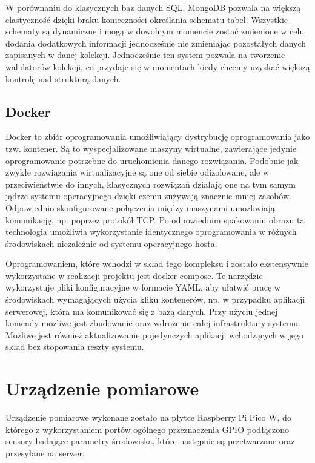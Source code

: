 W porównaniu do klasycznych baz danych SQL, MongoDB pozwala na większą elastyczność dzięki braku
konieczności określania schematu tabel. Wszystkie schematy są dynamiczne i mogą w dowolnym momencie 
zostać zmienione w celu dodania dodatkowych informacji jednocześnie nie zmieniając pozostałych
danych zapisanych w danej kolekcji. Jednocześnie ten system pozwala na tworzenie 
walidatorów kolekcji, co przydaje się w momentach kiedy chcemy uzyskać większą kontrolę
nad strukturą danych.

\subsection*{Docker}
Docker to zbiór oprogramowania umożliwiający dystrybucję oprogramowania jako tzw. kontener.
Są to wyspecjalizowane maszyny wirtualne, zawierające jedynie oprogramowanie potrzebne
do uruchomienia danego rozwiązania. Podobnie jak zwykłe rozwiązania wirtualizacyjne
są one od siebie odizolowane, ale w przeciwieństwie do innych, klasycznych rozwiązań
działają one na tym samym jądrze systemu operacyjnego dzięki czemu zużywają znacznie
mniej zasobów\cite{docker:what_is_container}. Odpowiednio skonfigurowane połączenia
między maszynami umożliwiają komunikację, np. poprzez protokół TCP. 
Po odpowiednim spakowaniu obrazu ta technologia umożliwia wykorzystanie identycznego
oprogramowania w różnych środowiskach niezależnie od systemu operacyjnego hosta.

Oprogramowaniem, które wchodzi w skład tego kompleksu i zostało ekstensywnie wykorzystane 
w realizacji projektu jest docker-compose. Te narzędzie wykorzystuje pliki konfiguracyjne
w formacie YAML, aby ułatwić pracę w środowiskach wymagających użycia kliku kontenerów, np.
w przypadku aplikacji serwerowej, która ma komunikować się z bazą danych. Przy użyciu
jednej komendy możliwe jest zbudowanie oraz wdrożenie całej infrastruktury systemu.
Możliwe jest również aktualizowanie pojedynczych aplikacji wchodzących w jego skład 
bez stopowania reszty systemu.

\section{Urządzenie pomiarowe}
Urządzenie pomiarowe wykonane zostało na płytce Raspberry Pi Pico W, do którego z wykorzystaniem
portów ogólnego przeznaczenia GPIO podłączono sensory badające parametry środowiska, 
które następnie są przetwarzane oraz przesyłane na serwer.

